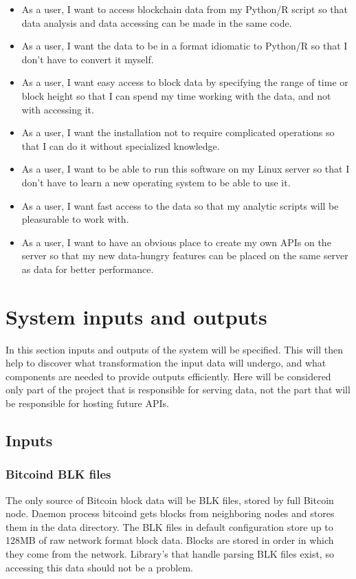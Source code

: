 \documentclass[12pt, en, eng, oneside, final]{mgr}
\begin{document}
\begin{itemize}
\item
As a user, I want to access blockchain data from my Python/R script so that data analysis and data accessing can be made in the same code.
\item
As a user, I want the data to be in a format idiomatic to Python/R so that I don't have to convert it myself.
\item
As a user, I want easy access to block data by specifying the range of time or block height so that I can spend my time working with the data, and not with accessing it.
\item
As a user, I want the installation not to require complicated operations so that I can do it without specialized knowledge.
\item
As a user, I want to be able to run this software on my Linux server so that I don't have to learn a new operating system to be able to use it.
\item
As a user, I want fast access to the data so that my analytic scripts will be pleasurable to work with.
\item
As a user, I want to have an obvious place to create my own APIs on the server so that my new data-hungry features can be placed on the same server as data for better performance.
\end{itemize}



\section{System inputs and outputs}

In this section inputs and outputs of the system will be specified. This will then help to discover what transformation the input data will undergo, and what components are needed to provide outputs efficiently. Here will be considered only part of the project that is responsible for serving data, not the part that will be responsible for hosting future APIs.

\subsection{Inputs}
\subsubsection{Bitcoind BLK files}
The only source of Bitcoin block data will be BLK files, stored by full Bitcoin node. Daemon process bitcoind gets blocks from neighboring nodes and stores them in the data directory. The BLK files in default configuration store up to 128MB of raw network format block data. Blocks are stored in order in which they come from the network. Library's that handle parsing BLK files exist, so accessing this data should not be a problem.
\end{document}

